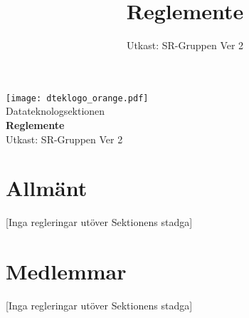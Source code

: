 \documentclass[a4paper]{dteklag}
\title{Reglemente}
\date{Utkast: SR-Gruppen Ver 2}
\begin{document}
\begin{titlepage}
  \thispagestyle{empty} %
  \vspace*{1cm}
  \begin{center}
    \texttt{[image: dteklogo\_orange.pdf]}\\[3em]
    {\Huge Datateknologsektionen}\\[3em]
    {\Huge \textbf{Reglemente}}\\[1em]
    Utkast: SR-Gruppen Ver 2
  \end{center}
\end{titlepage}

\makeheadfoot

\setcounter{tocdepth}{2}
\tableofcontents

\section{Allmänt}
\begin{center}
  [Inga regleringar utöver Sektionens stadga]
\end{center}
\section{Medlemmar}
\begin{center}
  [Inga regleringar utöver Sektionens stadga]
\end{center}
\end{document}
